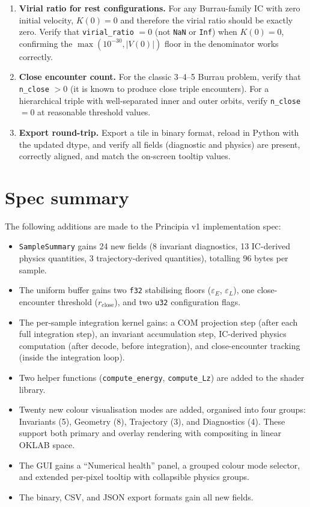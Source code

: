 \documentclass[11pt]{article}
\newcommand{\field}[1]{\texttt{#1}}
\newcommand{\struct}[1]{\texttt{#1}}
\begin{document}
\begin{enumerate}[nosep]
    \item \textbf{Virial ratio for rest configurations.} For any Burrau-family
    IC with zero initial velocity, $K(0) = 0$ and therefore the virial ratio
    should be exactly zero. Verify that \field{virial\_ratio} $= 0$ (not
    \texttt{NaN} or \texttt{Inf}) when $K(0) = 0$, confirming the
    $\max(10^{-30}, |V(0)|)$ floor in the denominator works correctly.

    \item \textbf{Close encounter count.} For the classic 3--4--5 Burrau
    problem, verify that \field{n\_close} $> 0$ (it is known to produce
    close triple encounters). For a hierarchical triple with well-separated
    inner and outer orbits, verify \field{n\_close} $= 0$ at reasonable
    threshold values.

    \item \textbf{Export round-trip.} Export a tile in binary format, reload in
    Python with the updated dtype, and verify all fields (diagnostic and
    physics) are present, correctly aligned, and match the on-screen tooltip
    values.
\end{enumerate}

\section{Spec summary}
\label{sec:summary}

The following additions are made to the Principia v1 implementation spec:

\begin{itemize}[nosep]
    \item \struct{SampleSummary} gains 24 new fields (8 invariant diagnostics,
    13 IC-derived physics quantities, 3 trajectory-derived quantities),
    totalling 96 bytes per sample.
    \item The uniform buffer gains two \texttt{f32} stabilising floors
    ($\varepsilon_E$, $\varepsilon_L$), one close-encounter threshold
    ($r_{\text{close}}$), and two \texttt{u32} configuration flags.
    \item The per-sample integration kernel gains: a COM projection step
    (after each full integration step), an invariant accumulation step,
    IC-derived physics computation (after decode, before integration),
    and close-encounter tracking (inside the integration loop).
    \item Two helper functions (\texttt{compute\_energy},
    \texttt{compute\_Lz}) are added to the shader library.
    \item Twenty new colour visualisation modes are added, organised into four
    groups: Invariants (5), Geometry (8), Trajectory (3), and
    Diagnostics (4). These support both primary and overlay rendering with
    compositing in linear OKLAB space.
    \item The GUI gains a ``Numerical health'' panel, a grouped colour mode
    selector, and extended per-pixel tooltip with collapsible physics groups.
    \item The binary, CSV, and JSON export formats gain all new fields.
\end{itemize}
\end{document}
